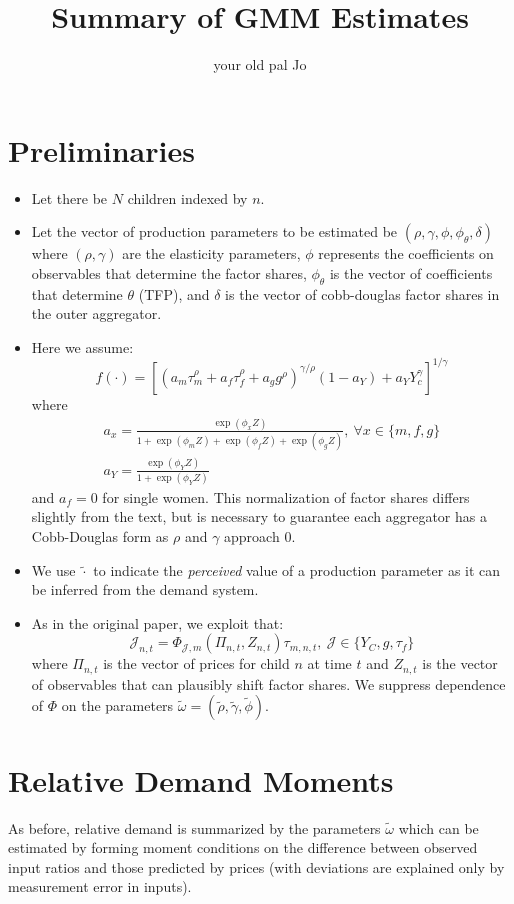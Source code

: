 \documentclass{article}
\title{Summary of GMM Estimates}
\author{your old pal Jo}
\begin{document}
\maketitle
\section*{Preliminaries}
\begin{itemize}
    \item Let there be $N$ children indexed by $n$.
    \item Let the vector of production parameters to be estimated be $(\rho,\gamma,\phi,\phi_{\theta},\delta)$ where $(\rho,\gamma)$ are the elasticity parameters, $\phi$ represents the coefficients on observables that determine the factor shares, $\phi_{\theta}$ is the vector of coefficients that determine $\theta$ (TFP), and $\delta$ is the vector of cobb-douglas factor shares in the outer aggregator.
    \item Here we assume:
    \[ f(\cdot) = \left[\left(a_{m}\tau_{m}^\rho+a_{f}\tau_{f}^\rho+a_{g}g^\rho\right)^{\gamma / \rho}(1-a_{Y}) + a_{Y}Y_{c}^{\gamma}\right]^{1/\gamma} \]
    where
    \begin{eqnarray}
        a_{x} = \frac{\exp(\phi_{x}Z)}{1+\exp(\phi_{m}Z)+\exp(\phi_{f}Z)+\exp(\phi_{g}Z)},\ \forall x\in\{m,f,g\} \nonumber \\
        a_{Y} = \frac{\exp(\phi_{Y}Z)}{1+\exp(\phi_{Y}Z)} \nonumber
    \end{eqnarray}
    and $a_{f}=0$ for single women. This normalization of factor shares differs slightly from the text, but is necessary to guarantee each aggregator has a Cobb-Douglas form as $\rho$ and $\gamma$ approach 0.
    \item We use $\tilde{\cdot}$ to indicate the \emph{perceived} value of a production parameter as it can be inferred from the demand system.
    \item As in the original paper, we exploit that:
     \[ \mathcal{J}_{n,t} = \Phi_{\mathcal{J},m}(\Pi_{n,t},Z_{n,t})\tau_{m,n,t},\ \mathcal{J}\in\{Y_{C},g,\tau_{f}\} \]
    where $\Pi_{n,t}$ is the vector of prices for child $n$ at time $t$ and $Z_{n,t}$ is the vector of observables that can plausibly shift factor shares. We suppress dependence of $\Phi$ on the parameters $\tilde{\omega}=(\tilde{\rho},\tilde{\gamma},\tilde{\phi})$.
\end{itemize}

\section*{Relative Demand Moments}
As before, relative demand is summarized by the parameters $\tilde{\omega}$ which can be estimated by forming moment conditions on the difference between observed input ratios and those predicted by prices (with deviations are explained only by measurement error in inputs).
\end{document}
